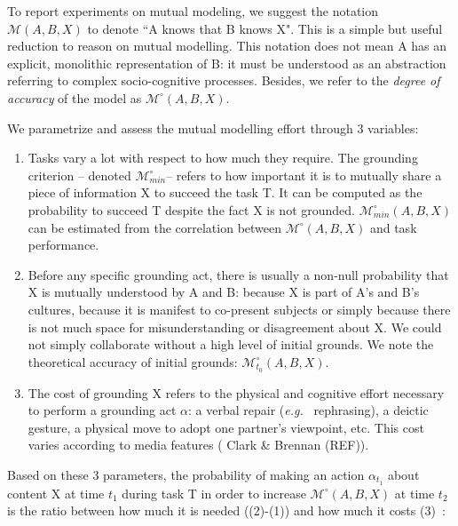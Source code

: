 \documentclass[twocolumn]{article}
\newcommand{\eg}{{\textit{e.g.\ }}}
\newcommand{\model}[3]{{$\mathcal{M}(#1, #2, #3)$}}
\newcommand{\Model}[3]{{$\mathcal{M}^{\circ}(#1, #2, #3)$}}
\newcommand{\groundingcriterion}{{$\mathcal{M}^{\circ}_{min}$}}
\begin{document}
To report experiments on mutual modeling, we suggest
the notation \model{A}{B}{X} to denote ``A knows that B knows X". This is a
simple but useful reduction to reason on mutual modelling. This
notation does not mean A has an explicit, monolithic representation of B: it
must be understood as an abstraction referring to complex socio-cognitive
processes. Besides, we refer to the \emph{degree of accuracy} of the model as
\Model{A}{B}{X}.

We parametrize and assess the mutual modelling effort through 3 variables:

\begin{enumerate}

    \item Tasks vary a lot with respect to how much they require.  The grounding
        criterion -- denoted \groundingcriterion -- refers to how
        important it is to mutually share a piece of information X to succeed
        the task T. It can be computed as the probability to succeed T despite
        the fact X is not grounded. $\mathcal{M}^{\circ}_{min}(A,B,X)$ can be
        estimated from the correlation between \Model{A}{B}{X} and task
        performance. 

    \item Before any specific grounding act, there is usually a non-null probability
        that X is mutually understood by A and B: because X is part of A's and
        B's cultures, because it is manifest to co-present subjects or simply
        because there is not much space for misunderstanding or disagreement
        about X. We could not simply collaborate without a high level of initial
        grounds. We note the theoretical accuracy of initial grounds:
        $\mathcal{M}^{\circ}_{t_0}(A,B,X)$.

    \item The cost of grounding X refers to the physical and cognitive effort
        necessary to perform a grounding act $\alpha$: a verbal repair (\eg
        rephrasing), a deictic gesture, a physical move to adopt one partner's
        viewpoint, etc. This cost varies according to media features ( Clark \&
        Brennan (REF)). 

\end{enumerate}

Based on these 3 parameters, the probability of making an action $\alpha_{t_1}$ about
content X at time $t_1$ during task T in order to increase \Model{A}{B}{X}
at time $t_2$ is the ratio between how much it is needed  ((2)-(1)) and how much it
costs (3)~\cite{traum1996miscommunication}:
\end{document}
